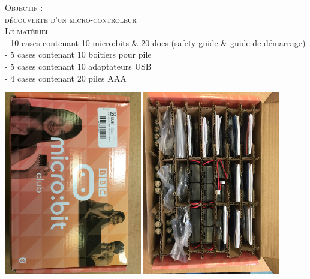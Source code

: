 \documentclass[a4paper, 11pt]{article}           %
\newcommand{\objectif}[1]{\textsc{\huge #1} }
\newcommand{\partie}[1]{\textsc{\huge #1} }
\begin{document}
\sffamily
\objectif{Objectif :\\découverte d'un micro-controleur}\\


\partie{Le matériel} \\ %
- 10 cases contenant 10 {micro:bits \& 20 docs (safety guide \& guide de démarrage)}\\
- 5 cases contenant 10 boitiers pour pile \\
- 5 cases contenant 10 adaptateurs USB\\
- 4 cases contenant 20 piles AAA
\begin{center}
\includegraphics[width=0.45\textwidth]{boite_fermee}
\includegraphics[width=0.45\textwidth]{boite_ouverte}
\end{center}
\end{document}

